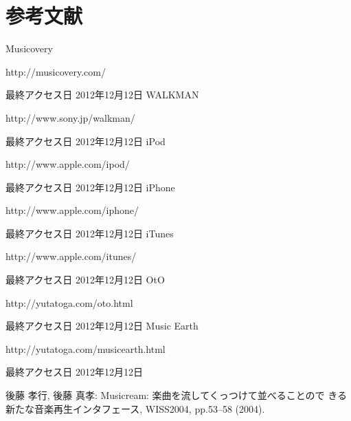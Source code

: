 \documentclass[11pt, onecolumn]{jsarticle}
\begin{document}
\section{参考文献}
\begin{thebibliography}{99}
Musicovery
\par
http://musicovery.com/
\par
最終アクセス日 2012年12月12日
WALKMAN
\par
http://www.sony.jp/walkman/
\par
最終アクセス日 2012年12月12日
iPod
\par
http://www.apple.com/ipod/
\par
最終アクセス日 2012年12月12日
iPhone
\par
http://www.apple.com/iphone/
\par
最終アクセス日 2012年12月12日
iTunes
\par
http://www.apple.com/itunes/
\par
最終アクセス日 2012年12月12日
OtO
\par
http://yutatoga.com/oto.html
\par
最終アクセス日 2012年12月12日
Music Earth
\par
http://yutatoga.com/musicearth.html
\par
最終アクセス日 2012年12月12日

後藤 孝行, 後藤 真孝: Musicream: 楽曲を流してくっつけて並べることので
きる新たな音楽再生インタフェース, WISS2004, pp.53–58 (2004).
\end{thebibliography}
\end{document}
